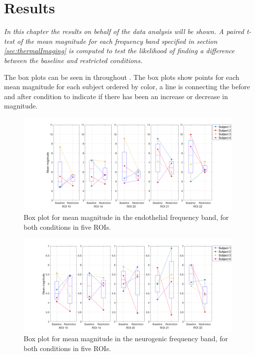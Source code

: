 \chapter{Results}
\textit{In this chapter the results on behalf of the data analysis will be shown. A paired t-test of the mean magnitude for each frequency band specified in section \ref{sec:thermalImaging} is computed to test the likelihood of finding a difference between the baseline and restricted conditions.}

The box plots can be seen in  throughout . The box plots show points for each mean magnitude for each subject ordered by color, a line is connecting the before and after condition to indicate if there has been an increase or decrease in magnitude. 

\begin{figure}[H]
	\includegraphics[width=1\textwidth]{figures/boxplot_endo}
	\caption{Box plot for mean magnitude in the endothelial frequency band, for both conditions in five ROIs.}
	\label{fig:boxEndo}
\end{figure}

\begin{figure}[H]
	\includegraphics[width=1\textwidth]{figures/boxplot_neuro}
	\caption{Box plot for mean magnitude in the neurogenic frequency band, for both conditions in five ROIs.}
	\label{fig:boxNeuro}
\end{figure}

